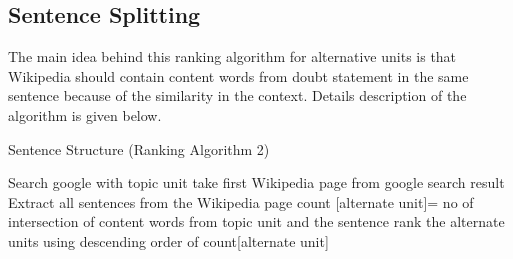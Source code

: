 \documentclass[11pt]{article}
\begin{document}
%
%
%
%
%
%
%


\subsection{Sentence Splitting}

The main idea behind this ranking algorithm for alternative units is that Wikipedia should contain content words from doubt statement in the same sentence because of the similarity in the context. Details description of the algorithm is given below.


\begin{algorithm}
\small
\caption{Sentence Structure (Ranking Algorithm 2)}
\label{alg:SentenceStructure} 
\begin{algorithmic}
\STATE Search google with topic unit
\STATE take first Wikipedia page from google search result
\STATE Extract all sentences from the Wikipedia page
			\STATE count [alternate unit]= no of intersection of content words from topic unit and the sentence
		\ENDIF
	\ENDFOR
\ENDFOR		
\STATE rank the alternate units using descending order of count[alternate unit]

\end{algorithmic}
\end{algorithm}
\end{document}
